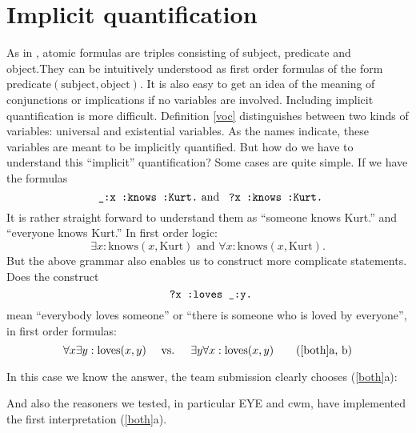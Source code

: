 \section{Implicit quantification}

As in \rdf, atomic formulas are triples consisting of subject, predicate and object.\linebreak They can be intuitively understood as 
first order formulas of the form \linebreak $\text{predicate}(\text{subject}, \text{object})$. It is also easy to get an idea of the meaning of conjunctions or implications 
if no variables are involved. Including implicit quantification is more difficult.
Definition \ref{voc} distinguishes between two kinds of variables: universal and existential variables. 
As the names indicate, these variables are meant to be implicitly quantified. But how do we have to understand this ``implicit'' quantification?
Some cases are quite simple. 
If we have the formulas
\[
\verb! _:x :knows :Kurt.! \text{ and } \verb! ?x :knows :Kurt.!
\]
It is rather straight forward to understand them as ``someone knows Kurt.'' and ``everyone knows Kurt.'' In first order logic:
\[
\exists x: \text{knows}(x, \text{Kurt}) \text{ and } \forall x: \text{knows}(x, \text{Kurt}).
\]
But the above grammar also enables us to construct more complicate statements. Does the construct 
\begin{equation}\label{both} \verb! ?x :loves _:y.!\end{equation} mean 
``everybody loves someone'' or ``there is someone
who is loved by everyone'', in first order formulas: 
\begin{equation} %
\forall x \exists y : \text{loves}(x,y)\quad  \text{ vs. }\quad \exists y \forall x : \text{loves}(x,y) \tag{\ref{both}a, b}
\end{equation}


In this case we know the answer, the team submission \cite{Notation3} clearly chooses (\ref{both}a): 

%
And also the reasoners we tested, in particular EYE and cwm, have implemented the first interpretation (\ref{both}a).

